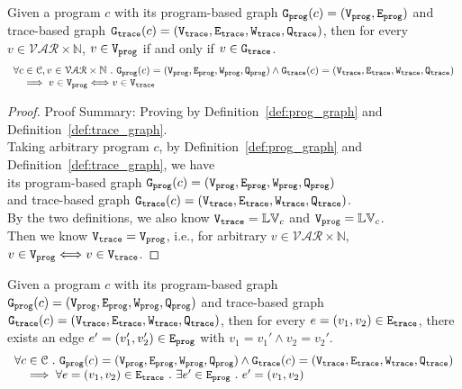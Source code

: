 	\begin{lem}
	\label{lem:vertex_map}
	Given a program $c$ with its
	program-based graph $\mathtt{{G_{prog}}}({c}) = (\mathtt{{V_{prog}}}, \mathtt{{E_{prog}}})$
	and 
	trace-based graph $\mathtt{{G_{trace}}}({c}) = (\mathtt{{V_{trace}}}, \mathtt{{E_{trace}}}, \mathtt{{W_{trace}}}, \mathtt{{Q_{trace}}})$,
	then for every $v \in \mathcal{VAR} \times \mathbb{N}$,
	$v \in \mathtt{{V_{prog}}}$ if and only if $v \in \mathtt{{G_{trace}}}$.
	\[
	\begin{array}{l}
	\forall c \in \mathcal{C} , v \in \mathcal{VAR} \times \mathbb{N} ~.~ 
	\mathtt{{G_{prog}}}({c}) = (\mathtt{{V_{prog}}}, \mathtt{{E_{prog}}}, \mathtt{{W_{prog}}}, \mathtt{{Q_{prog}}})
	\land 
	\mathtt{{G_{trace}}}({c}) = (\mathtt{{V_{trace}}}, \mathtt{{E_{trace}}}, \mathtt{{W_{trace}}}, \mathtt{{Q_{trace}}})
	\\ \quad
	\implies
	v \in \mathtt{{V_{prog}}} \Longleftrightarrow v \in \mathtt{{V_{trace}}}
	\end{array}
	\]
	\end{lem}
\begin{proof}
Proof Summary: Proving by Definition~\ref{def:prog_graph} and Definition~\ref{def:trace_graph}.
\\
Taking arbitrary program $c$,
by Definition~\ref{def:prog_graph} and Definition~\ref{def:trace_graph}, 
we have   
\\
its program-based graph $\mathtt{{G_{prog}}}({c}) = (\mathtt{{V_{prog}}}, \mathtt{{E_{prog}}}, \mathtt{{W_{prog}}}, \mathtt{{Q_{prog}}})$ 
\\
and 
trace-based graph $\mathtt{{G_{trace}}}({c}) = (\mathtt{{V_{trace}}}, \mathtt{{E_{trace}}}, \mathtt{{W_{trace}}}, \mathtt{{Q_{trace}}})$.
\\
By the two definitions, we also know 
$\mathtt{{V_{trace}}}  = \mathbb{LV}_c$ and $\mathtt{{V_{prog}}} = \mathbb{LV}_c$.
\\
Then we know $\mathtt{{V_{trace}}}  = \mathtt{{V_{prog}}}$, i.e., 
for arbitrary $v \in \mathcal{VAR} \times \mathbb{N}$, $v \in \mathtt{{V_{prog}}} \Longleftrightarrow v \in \mathtt{{V_{trace}}}$.
\end{proof}
%
	\begin{lem}
	\label{lem:edge_map}
	Given a program $c$ with its
	program-based graph $\mathtt{{G_{prog}}}({c}) = (\mathtt{{V_{prog}}}, \mathtt{{E_{prog}}}, \mathtt{{W_{prog}}}, \mathtt{{Q_{prog}}})$
	and 
	trace-based graph $\mathtt{{G_{trace}}}({c}) = (\mathtt{{V_{trace}}}, \mathtt{{E_{trace}}}, \mathtt{{W_{trace}}}, \mathtt{{Q_{trace}}})$,
	then for every $e = (v_1, v_2) \in \mathtt{{E_{trace}}}$, there exists an edge 
	$e' = (v_1', v_2') \in \mathtt{{E_{prog}}}$ with 
	$v_1 = v_1' \land v_2 = v_2'$.
	\[
	\begin{array}{l}
	\forall c \in \mathcal{C} ~.~
	 \mathtt{{G_{prog}}}({c}) = (\mathtt{{V_{prog}}}, \mathtt{{E_{prog}}}, \mathtt{{W_{prog}}}, \mathtt{{Q_{prog}}})
	\land 
	\mathtt{{G_{trace}}}({c}) = (\mathtt{{V_{trace}}}, \mathtt{{E_{trace}}}, \mathtt{{W_{trace}}}, \mathtt{{Q_{trace}}})
	\\ \quad
	\implies
	\forall e = (v_1, v_2) \in \mathtt{{E_{trace}}}
	~.~ 
	\exists e' \in \mathtt{{E_{prog}}} ~.~ e' = (v_1, v_2)
	\end{array}
	\]
	\end{lem}
